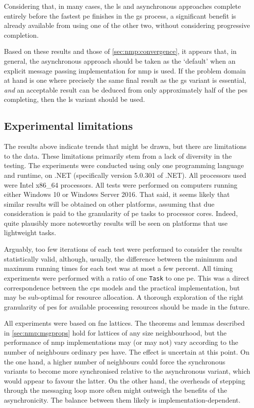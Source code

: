 Considering that, in many cases, the \gls{ls} and asynchronous approaches complete entirely before the fastest \gls{pe} finishes in the \gls{gs} process, a significant benefit is already available from using one of the other two, without considering progressive completion.

Based on these results and those of \cref{sec:nmp:convergence}, it appears that, in general, the asynchronous approach should be taken as the `default' when an explicit message passing implementation for \gls{nmp} is used.  If the problem domain at hand is one where precisely the same final result as the \gls{gs} variant is essential, \emph{and} an acceptable result can be deduced from only approximately half of the \glspl{pe} completing, then the \gls{ls} variant should be used.

\subsection{Experimental limitations}
The results above indicate trends that might be drawn, but there are limitations to the data.  These limitations primarily stem from a lack of diversity in the testing.  The experiments were conducted using only one programming language and runtime, \csharp{} on .NET (specifically version 5.0.301 of .NET).  All processors used were Intel x86\_64 processors.  All tests were performed on computers running either Windows 10 or Windows Server 2016.  That said, it seems likely that similar results will be obtained on other platforms, assuming that due consideration is paid to the granularity of \gls{pe} tasks to processor cores.  Indeed, quite plausibly more noteworthy results will be seen on platforms that use lightweight tasks.

Arguably, too few iterations of each test were performed to consider the results statistically valid, although, usually, the difference between the minimum and maximum running times for each test was at most a few percent.  All timing experiments were performed with a ratio of one \texttt{Task} to one \gls{pe}.  This was a direct correspondence between the \gls{cps} models and the practical implementation, but may be sub-optimal for resource allocation.  A thorough exploration of the right granularity of \glspl{pe} for available processing resources should be made in the future.

All experiments were based on \gls{fne} lattices.  The theorems and lemmas described in \cref{sec:nmp:msgprops} hold for lattices of any size neighbourhood, but the performance of \gls{nmp} implementations may (or may not) vary according to the number of neighbours ordinary \glspl{pe} have.  The effect is uncertain at this point.  On the one hand, a higher number of neighbours could force the synchronous variants to become more synchronised relative to the asynchronous variant, which would appear to favour the latter.  On the other hand, the overheads of stepping through the messaging loop more often might outweigh the benefits of the asynchronicity.  The balance between them likely is implementation-dependent.